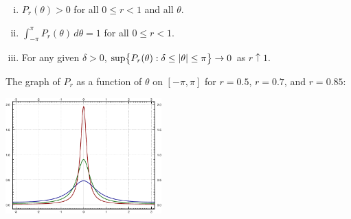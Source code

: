 \documentclass[10pt,aspectratio=169]{beamer}
\begin{document}
\begin{frame}
\begin{proposition}
\begin{enumerate}[(i)]
\item
$P_r(\theta) > 0$ for all $0 \leq r < 1$ and all $\theta$.
\pause
\item
$\int_{-\pi}^{\pi} P_r(\theta) \, d\theta = 1$
for all $0 \leq r < 1$.
\pause
\item
For any given $\delta > 0$,
$\sup \bigl\{P_r(\theta) : \delta \leq \left\lvert {\theta} \right\rvert \leq
\pi \bigr\} \to 0$ as $r \uparrow 1$.
\end{enumerate}
\end{proposition}

\pause

The graph of $P_r$ as a function of $\theta$ on $[-\pi,\pi]$ for
$r=0.5$, $r=0.7$, and $r=0.85$:

\begin{center}
\includegraphics[width=0.45\textwidth]{../figures/poisson-kernel.pdf}
\end{center}

\end{frame}
\end{document}
